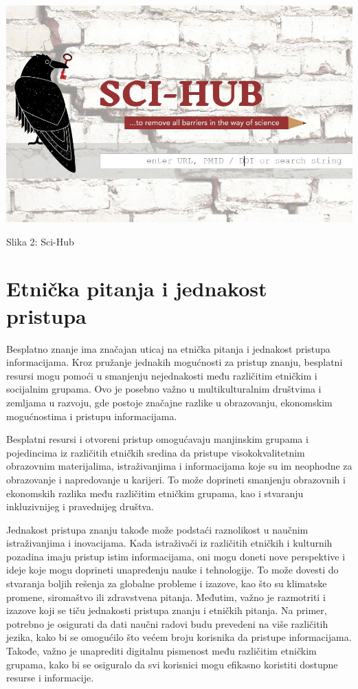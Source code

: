 \documentclass[a4paper]{article}
\begin{document}
{\begin{center}
\includegraphics[scale=0.3]{scihub.jpg}
\end{center}
\caption{Slika 2: Sci-Hub}
\label{sci-hub}


\setlength{\parskip}{1em}


\section{Etnička pitanja i jednakost pristupa}
\label{Etnička pitanja i jednakost pristupa}


Besplatno znanje ima značajan uticaj na etnička pitanja i jednakost pristupa informacijama. Kroz pružanje jednakih mogućnosti za pristup znanju, besplatni resursi mogu pomoći u smanjenju nejednakosti među različitim etničkim i socijalnim grupama. Ovo je posebno važno u multikulturalnim društvima i zemljama u razvoju, gde postoje značajne razlike u obrazovanju, ekonomskim mogućnostima i pristupu informacijama.

Besplatni resursi i otvoreni pristup omogućavaju manjinskim grupama i pojedincima iz različitih etničkih sredina da pristupe visokokvalitetnim obrazovnim materijalima, istraživanjima i informacijama koje su im neophodne za obrazovanje i napredovanje u karijeri. To može doprineti smanjenju obrazovnih i ekonomskih razlika među različitim etničkim grupama, kao i stvaranju inkluzivnijeg i pravednijeg društva.

Jednakost pristupa znanju takođe može podstaći raznolikost u naučnim istraživanjima i inovacijama. Kada istraživači iz različitih etničkih i kulturnih pozadina imaju pristup istim informacijama, oni mogu doneti nove perspektive i ideje koje mogu doprineti unapređenju nauke i tehnologije. To može dovesti do stvaranja boljih rešenja za globalne probleme i izazove, kao što su klimatske promene, siromaštvo ili zdravstvena pitanja.
Međutim, važno je razmotriti i izazove koji se tiču jednakosti pristupa znanju i etničkih pitanja. Na primer, potrebno je osigurati da dati naučni radovi budu prevedeni na više različitih jezika, kako bi se omogućilo što većem broju korisnika da pristupe informacijama. Takođe, važno je unaprediti digitalnu pismenost među različitim etničkim grupama, kako bi se osiguralo da svi korisnici mogu efikasno koristiti dostupne resurse i informacije.

}
\end{document}
